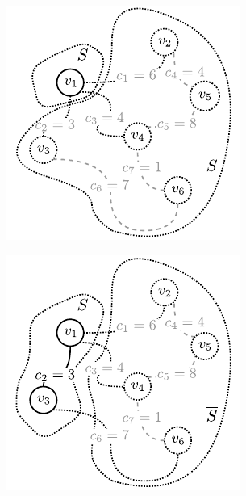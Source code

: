 \begin{figure}[!htbp]
	\begin{subfigure}[b]{0.29\textwidth}
		\includegraphics[width=\textwidth]{Chapter_I/PRIME-example/a}
		\caption{}
		\label{fig:prime:a}
	\end{subfigure}
	\hfill
	\begin{subfigure}[b]{0.29\textwidth}
		\includegraphics[width=\textwidth]{Chapter_I/PRIME-example/b}

\end{subfigure}
\end{figure}
